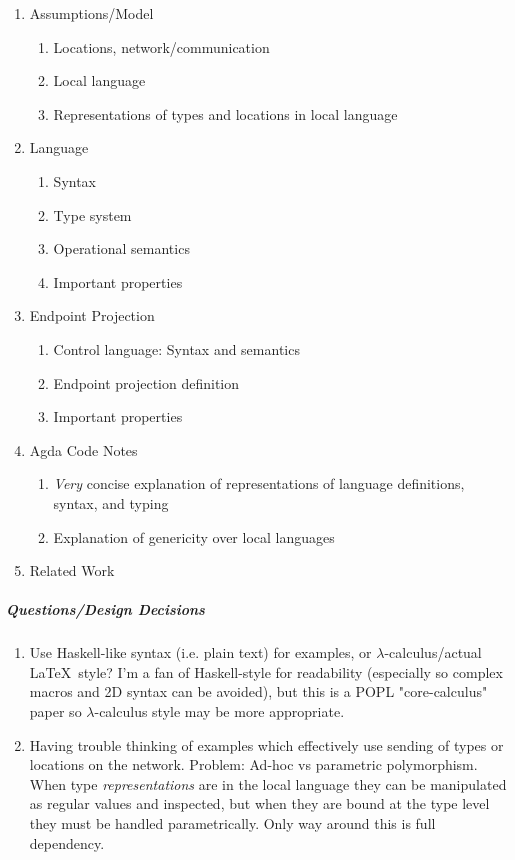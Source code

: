 \documentclass{article}
\theoremstyle{definition}
\begin{document}
\begin{enumerate}
\begin{enumerate}
\begin{verbatim}
\end{verbatim}
	\end{enumerate}
	\item Assumptions/Model
	\begin{enumerate}
		\item Locations, network/communication
		\item Local language
		\item Representations of types and locations in local language
	\end{enumerate}
		
	\item Language
	\begin{enumerate}
		\item Syntax
		\item Type system
		\item Operational semantics
		\item Important properties
	\end{enumerate}
		
	\item Endpoint Projection
	\begin{enumerate}
		\item Control language: Syntax and semantics
		\item Endpoint projection definition
		\item Important properties
	\end{enumerate}
	
	\item Agda Code Notes
	\begin{enumerate}
		\item \emph{Very} concise explanation of representations of language definitions, syntax, and typing
		\item Explanation of genericity over local languages
	\end{enumerate}
	
	\item Related Work
\end{enumerate}

\subparagraph{Questions/Design Decisions}
\begin{enumerate}
	\item Use Haskell-like syntax (i.e. plain text) for examples, or $\lambda$-calculus/actual \LaTeX\ style? I'm a fan of Haskell-style for readability (especially so complex macros and 2D syntax can be avoided), but this is a POPL "core-calculus" paper so $\lambda$-calculus style may be more appropriate.
	\item Having trouble thinking of examples which effectively use sending of types or locations on the network. Problem: Ad-hoc vs parametric polymorphism. When type \emph{representations} are in the local language they can be manipulated as regular values and inspected, but when they are bound at the type level they must be handled parametrically. Only way around this is full dependency.
\end{enumerate}
\end{document}
